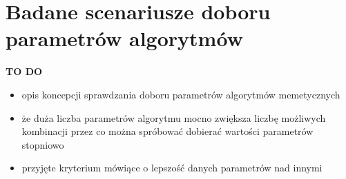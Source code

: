 \section{Badane scenariusze doboru parametrów algorytmów}
\textbf{TO DO}
\begin{itemize}
\item opis koncepcji sprawdzania doboru parametrów algorytmów memetycznych
\item że duża liczba parametrów algorytmu mocno zwiększa liczbę możliwych kombinacji przez co można spróbować dobierać wartości parametrów stopniowo
\item przyjęte kryterium mówiące o lepszość danych parametrów nad innymi
\end{itemize}